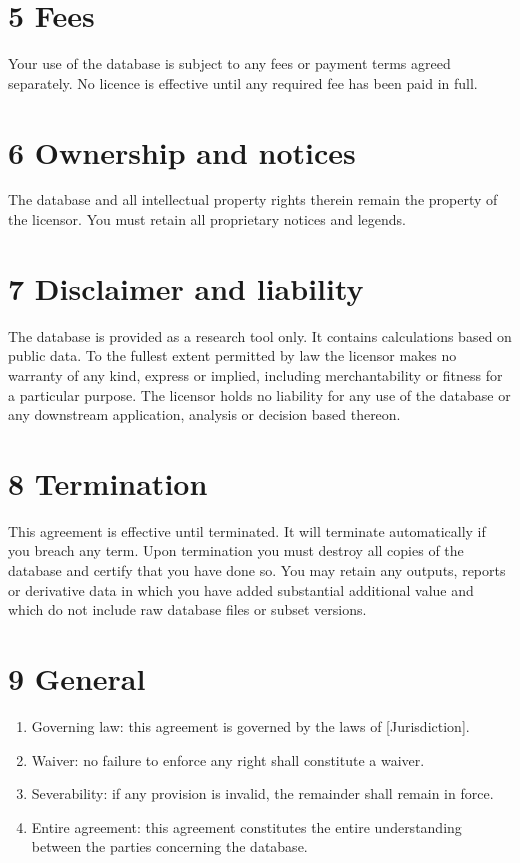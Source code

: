 \documentclass[12pt]{article}
\begin{document}
\section*{5 Fees}
Your use of the database is subject to any fees or payment terms agreed separately. No licence is effective until any required fee has been paid in full.

\section*{6 Ownership and notices}
The database and all intellectual property rights therein remain the property of the licensor. You must retain all proprietary notices and legends.

\section*{7 Disclaimer and liability}
The database is provided as a research tool only. It contains calculations based on public data. To the fullest extent permitted by law the licensor makes no warranty of any kind, express or implied, including merchantability or fitness for a particular purpose. The licensor holds no liability for any use of the database or any downstream application, analysis or decision based thereon.

\section*{8 Termination}
This agreement is effective until terminated. It will terminate automatically if you breach any term. Upon termination you must destroy all copies of the database and certify that you have done so. You may retain any outputs, reports or derivative data in which you have added substantial additional value and which do not include raw database files or subset versions.

\section*{9 General}
\begin{enumerate}
  \item Governing law: this agreement is governed by the laws of [Jurisdiction].
  \item Waiver: no failure to enforce any right shall constitute a waiver.
  \item Severability: if any provision is invalid, the remainder shall remain in force.
  \item Entire agreement: this agreement constitutes the entire understanding between the parties concerning the database.
\end{enumerate}
\end{document}
